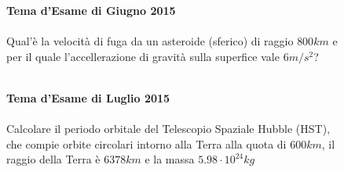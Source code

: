 \begin{figure}[h!]
\textbf{Tema d'Esame di Giugno 2015}\\ \\
Qual'è la velocità di fuga da un asteroide (sferico) di raggio $800km$ e per il quale l'accellerazione di gravità sulla superfice vale $6m/s^2$?\\ \\
\noindent{}	
\end{figure}

\begin{figure}[h!]
\textbf{Tema d'Esame di Luglio 2015}\\ \\
Calcolare il periodo orbitale del Telescopio Spaziale Hubble (HST), che compie orbite circolari intorno alla Terra alla quota di $600km$, il raggio della Terra è $6378km$ e la massa $5.98\cdot 10^{24}kg$
\end{figure}